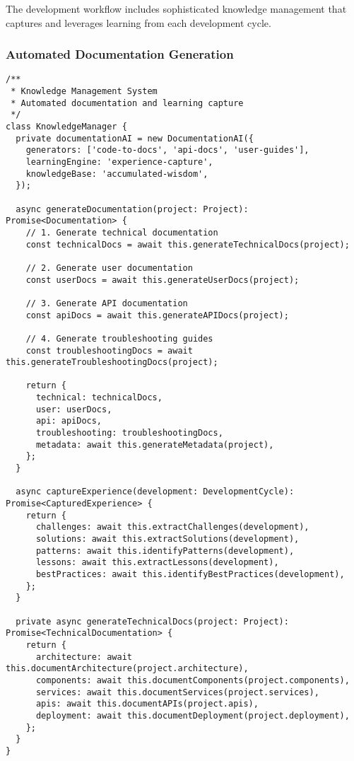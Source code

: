 \documentclass[11pt,a4paper]{article}
\begin{document}
The development workflow includes sophisticated knowledge management that captures and leverages learning from each development cycle.

\subsubsection{Automated Documentation Generation}

\begin{lstlisting}[style=typescript, caption=AI-Powered Documentation System]
/**
 * Knowledge Management System
 * Automated documentation and learning capture
 */
class KnowledgeManager {
  private documentationAI = new DocumentationAI({
    generators: ['code-to-docs', 'api-docs', 'user-guides'],
    learningEngine: 'experience-capture',
    knowledgeBase: 'accumulated-wisdom',
  });

  async generateDocumentation(project: Project): Promise<Documentation> {
    // 1. Generate technical documentation
    const technicalDocs = await this.generateTechnicalDocs(project);

    // 2. Generate user documentation
    const userDocs = await this.generateUserDocs(project);

    // 3. Generate API documentation
    const apiDocs = await this.generateAPIDocs(project);

    // 4. Generate troubleshooting guides
    const troubleshootingDocs = await this.generateTroubleshootingDocs(project);

    return {
      technical: technicalDocs,
      user: userDocs,
      api: apiDocs,
      troubleshooting: troubleshootingDocs,
      metadata: await this.generateMetadata(project),
    };
  }

  async captureExperience(development: DevelopmentCycle): Promise<CapturedExperience> {
    return {
      challenges: await this.extractChallenges(development),
      solutions: await this.extractSolutions(development),
      patterns: await this.identifyPatterns(development),
      lessons: await this.extractLessons(development),
      bestPractices: await this.identifyBestPractices(development),
    };
  }

  private async generateTechnicalDocs(project: Project): Promise<TechnicalDocumentation> {
    return {
      architecture: await this.documentArchitecture(project.architecture),
      components: await this.documentComponents(project.components),
      services: await this.documentServices(project.services),
      apis: await this.documentAPIs(project.apis),
      deployment: await this.documentDeployment(project.deployment),
    };
  }
}
\end{lstlisting}
\end{document}
